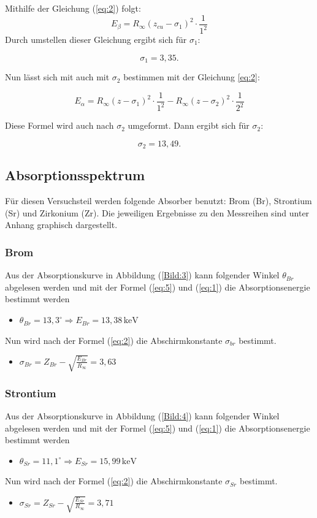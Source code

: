 Mithilfe der Gleichung (\ref{eq:2}) folgt:
\begin{equation*}
  E_\beta = R_\infty (z_{cu} - \sigma_1)^2 \cdot \frac{1}{1^2}
\end{equation*}
Durch umstellen dieser Gleichung ergibt sich für $\sigma_1$:

\begin{equation*}
  \sigma_1 = 3,35.
\end{equation*}

Nun lässt sich mit auch mit $\sigma_2$ bestimmen mit der Gleichung \ref{eq:2}:

\begin{equation*}
  E_\alpha = R_\infty (z-\sigma_1)^2 \cdot \frac{1}{1^2} - R_\infty (z-\sigma_2)^2 \cdot \frac{1}{2^2}
\end{equation*}

Diese Formel wird auch nach $\sigma_2$ umgeformt. Dann ergibt sich für $\sigma_2$:

\begin{equation*}
  \sigma_2 = 13,49.
\end{equation*}

\subsection{Absorptionsspektrum}
Für diesen Versuchsteil werden folgende Absorber benutzt: Brom (Br), Strontium (Sr) und Zirkonium (Zr).
Die jeweiligen Ergebnisse zu den Messreihen sind unter Anhang graphisch dargestellt.
\subsubsection{Brom}
Aus der Absorptionskurve in Abbildung (\ref{Bild:3}) kann folgender Winkel $\theta_{Br}$ abgelesen werden und mit der Formel (\ref{eq:5}) und (\ref{eq:1}) die
Absorptionsenergie bestimmt werden
\begin{itemize}
  \item $\theta_{Br} = 13,3^\circ \Rightarrow E_{Br} = 13,38 \, \text{keV}$
\end{itemize}
Nun wird nach der Formel (\ref{eq:2}) die Abschirmkonstante $\sigma_{br}$ bestimmt.
\begin{itemize}
  \item $\sigma_{Br} = Z_{Br} - \sqrt{\frac{E_{Br}}{R_\infty}} = 3,63$
\end{itemize}

\subsubsection{Strontium}
Aus der Absorptionskurve in Abbildung (\ref{Bild:4}) kann folgender Winkel abgelesen werden und mit der Formel (\ref{eq:5}) und (\ref{eq:1}) die
Absorptionsenergie bestimmt werden
\begin{itemize}
  \item $\theta_{Sr} = 11,1^\circ \Rightarrow E_{Sr} = 15,99 \,\text{keV}$
\end{itemize}
Nun wird nach der Formel (\ref{eq:2}) die Abschirmkonstante $\sigma_{Sr}$ bestimmt.
\begin{itemize}
  \item $\sigma_{Sr} = Z_{Sr} - \sqrt{\frac{E_{Sr}}{R_\infty}} = 3,71$
\end{itemize}
